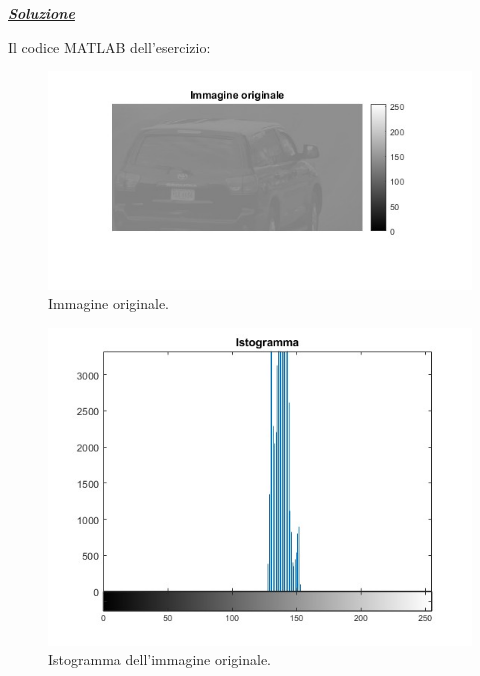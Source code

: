 \documentclass[a4paper]{article}
\begin{document}
	\noindent
	\textcolor{Green4}{\textbf{\emph{\underline{Soluzione}}}}\newline
	
	\noindent
	Il codice MATLAB dell'esercizio:
	\newpage
	
	\begin{figure}[!htp]
		\centering
		\includegraphics[width=\textwidth]{img/lab/operatori_puntuali-1.jpg}
		\caption{Immagine originale.}
	\end{figure}
	\begin{figure}[!htp]
		\centering
		\includegraphics[width=\textwidth]{img/lab/operatori_puntuali-2.jpg}
		\caption{Istogramma dell'immagine originale.}
	\end{figure}\newpage
	
\end{document}
